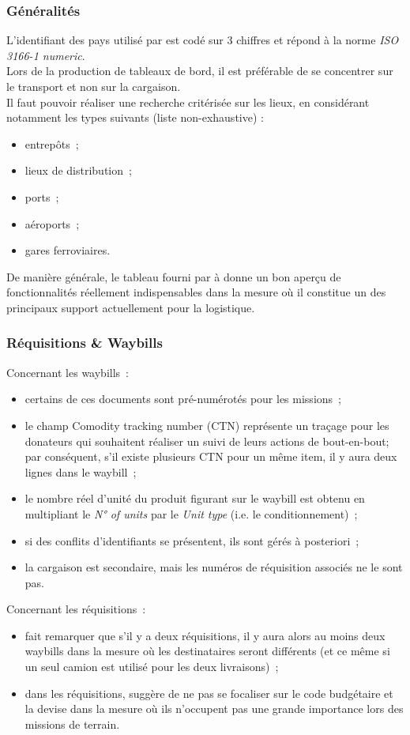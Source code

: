 \documentclass[11pt,fleqn]{report}
\begin{document}
\subsubsection{Généralités}
L'identifiant des pays utilisé par \mo est codé sur 3 chiffres et répond à la norme \emph{ISO 3166-1 numeric}.
\\
Lors de la production de tableaux de bord, il est préférable de se concentrer sur le transport et non sur la cargaison.
\\
Il faut pouvoir réaliser une recherche critérisée sur les lieux, en considérant notamment les types suivants (liste non-exhaustive) :
\begin{itemize}
	\item entrepôts~;
	\item lieux de distribution~;
	\item ports~;
	\item aéroports~;
	\item gares ferroviaires.
\end{itemize}
De manière générale, le tableau fourni par \mo à \amo donne un bon aperçu de fonctionnalités réellement indispensables dans la mesure où il constitue un des principaux support actuellement pour la logistique.

\subsubsection{Réquisitions \& Waybills}
Concernant les waybills~:
\begin{itemize}
	\item certains de ces documents sont pré-numérotés pour les missions~;
	\item le champ \og{}Comodity tracking number\fg{} (CTN) représente un traçage pour les donateurs qui souhaitent réaliser un suivi de leurs actions de bout-en-bout; par conséquent, s'il existe plusieurs CTN pour un même item, il y aura deux lignes dans le waybill~;
	\item le nombre réel d'unité du produit figurant sur le waybill est obtenu en multipliant le \emph{N° of units} par le \emph{Unit type} (i.e. le conditionnement)~;
	\item si des conflits d'identifiants se présentent, ils sont gérés à posteriori~;
	\item la cargaison est secondaire, mais les numéros de réquisition associés ne le sont pas.
\end{itemize}
Concernant les réquisitions~:
\begin{itemize}
	\item \mo fait remarquer que s'il y a deux réquisitions, il y aura alors au moins deux waybills dans la mesure où les destinataires seront différents (et ce même si un seul camion est utilisé pour les deux livraisons)~;
	\item dans les réquisitions, \mo suggère de ne pas se focaliser sur le code budgétaire et la devise dans la mesure où ils n'occupent pas une grande importance lors des missions de terrain.
\end{itemize}
\end{document}
